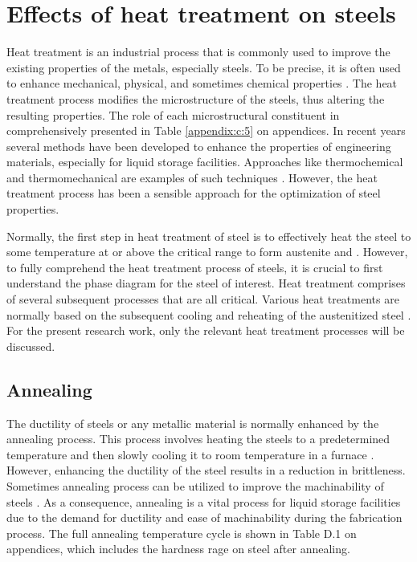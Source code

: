 \section{Effects of heat treatment on steels} 
Heat treatment is an industrial process that is commonly used to improve the existing properties of the metals, especially steels. To be precise, it is often used to enhance mechanical, physical, and sometimes chemical properties \cite{mampuya2021effect}. The heat treatment process modifies the microstructure of the steels, thus altering the resulting properties. The role of each microstructural constituent in comprehensively presented in Table \ref{appendix:c:5} on appendices. In recent years several methods have been developed to enhance the properties of engineering materials, especially for liquid storage facilities. Approaches like thermochemical and thermomechanical are examples of such techniques \cite{singh2020applied}. However, the heat treatment process has been a sensible approach for the optimization of steel properties.

Normally, the first step in heat treatment of steel is to effectively heat the steel to some temperature at or above the critical range to form austenite and  \cite{mampuya2021effect}. However, to fully comprehend the heat treatment process of steels, it is crucial to first understand the phase diagram for the steel of interest. Heat treatment comprises of several subsequent processes that are all critical. Various heat treatments are normally based on the subsequent cooling and reheating of the austenitized steel \cite{singh2020applied}.  For the present research work, only the relevant heat treatment processes will be discussed.

\subsection{Annealing}
The ductility of steels or any metallic material is normally enhanced by the annealing process. This process involves heating the steels to a predetermined temperature and then slowly cooling it to room temperature in a furnace \cite{singh2020applied}. However, enhancing the ductility of the steel results in a reduction in brittleness. Sometimes annealing process can be utilized to improve the machinability of steels \cite{nikkhah2019improved}. As a consequence, annealing is a vital process for liquid storage facilities due to the demand for ductility and ease of machinability during the fabrication process. The full annealing temperature cycle is shown in Table D.1 on appendices, which includes the hardness rage on steel after annealing. 

